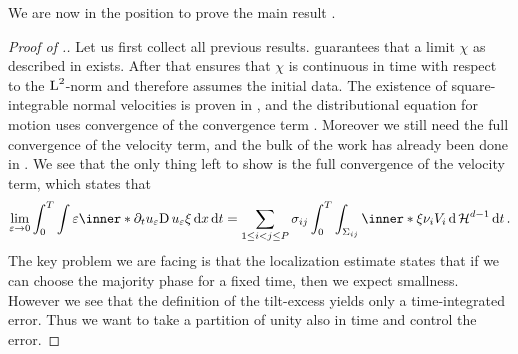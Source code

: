 We are now in the position to prove the main result 
.

\begin{proof}[Proof of .]
	Let us first collect all previous results.
	 guarantees that a limit $ \chi 
	$  as described in  exists.
	After that  ensures that 
	$ \chi $ is continuous in time with respect to the $ \operatorname{L}^{ 2 } $-norm and 
	therefore assumes the initial data. The existence of square-integrable 
	normal velocities is proven in 
	, and the 
	distributional equation for motion uses convergence of the convergence term 
	. Moreover we still need the full 
	convergence of the velocity term, and the bulk of the work has already been 
	done in .
	We see that the only thing left to show is the full convergence 
	of the velocity term, which states that
	\begin{equation*}
		\lim_{ \varepsilon \to 0 }
		\int_{ 0 }^{ T }
		\int
		\varepsilon
		\inner*{ \partial_{ t } u_{ 
				\varepsilon } }{ \diff u_{ \varepsilon } \xi }
		\dd{ x }
		\dd{ t }
		=
		\sum_{ 1 \leq i < j \leq P }
		\sigma_{ i j }
		\int_{ 0 }^{ T }
		\int_{ \Sigma_{ i j } }
		\inner*{ \xi }{ \nu_{ i } }
		V_{ i }
		\dd{ \hm^{ d - 1 } }
		\dd{ t }.
	\end{equation*} 
	The key problem we are facing is that the localization estimate 
	 states that if we can choose the 
	majority phase for a fixed time, then we expect smallness. However we see 
	that the definition of the tilt-excess yields only a time-integrated error. 
	Thus we want to take a partition of unity also in time and control the 
	error.
	

\end{proof}
